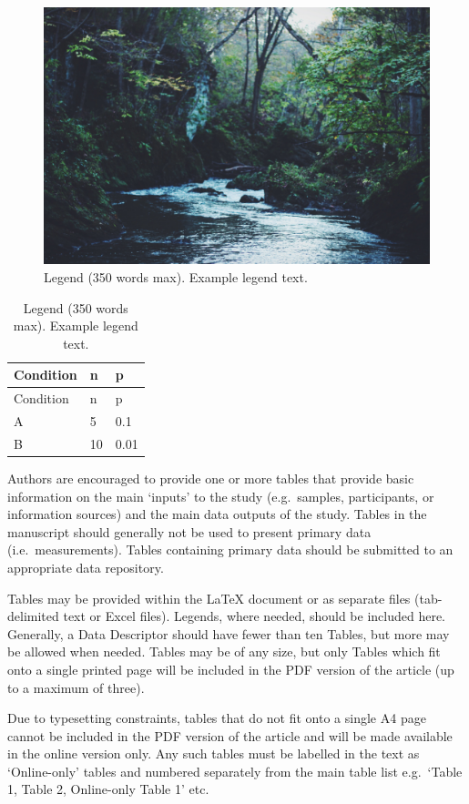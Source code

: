 \documentclass[fleqn,10pt]{wlscirep}
\begin{document}
\begin{figure}

{\centering \includegraphics{stream.jpg}

}

\caption{\label{fig-stream}Legend (350 words max). Example legend text.}

\end{figure}

\hypertarget{tbl-example}{}
\begin{longtable}[]{@{}lll@{}}
\caption{\label{tbl-example}Legend (350 words max). Example legend
text.}\tabularnewline
\toprule\noalign{}
Condition & n & p \\
\midrule\noalign{}
\endfirsthead
\toprule\noalign{}
Condition & n & p \\
\midrule\noalign{}
\endhead
\bottomrule\noalign{}
\endlastfoot
A & 5 & 0.1 \\
B & 10 & 0.01 \\
\end{longtable}

Authors are encouraged to provide one or more tables that provide basic
information on the main `inputs' to the study (e.g.~samples,
participants, or information sources) and the main data outputs of the
study. Tables in the manuscript should generally not be used to present
primary data (i.e.~measurements). Tables containing primary data should
be submitted to an appropriate data repository.

Tables may be provided within the {\LaTeX} document or as separate files
(tab-delimited text or Excel files). Legends, where needed, should be
included here. Generally, a Data Descriptor should have fewer than ten
Tables, but more may be allowed when needed. Tables may be of any size,
but only Tables which fit onto a single printed page will be included in
the PDF version of the article (up to a maximum of three).

Due to typesetting constraints, tables that do not fit onto a single A4
page cannot be included in the PDF version of the article and will be
made available in the online version only. Any such tables must be
labelled in the text as `Online-only' tables and numbered separately
from the main table list e.g.~`Table 1, Table 2, Online-only Table 1'
etc.
\end{document}
